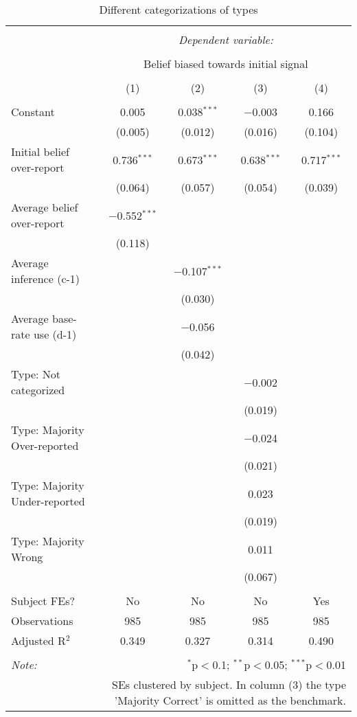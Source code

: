 
\begin{table}[!htbp] \centering 
  \caption{Different categorizations of types} 
  \label{tab:retractions_types} 
\begin{tabular}{@{\extracolsep{5pt}}lcccc} 
\\[-1.8ex]\hline 
\hline \\[-1.8ex] 
 & \multicolumn{4}{c}{\textit{Dependent variable:}} \\ 
\cline{2-5} 
\\[-1.8ex] & \multicolumn{4}{c}{Belief biased towards initial signal} \\ 
\\[-1.8ex] & (1) & (2) & (3) & (4)\\ 
\hline \\[-1.8ex] 
 Constant & 0.005 & 0.038$^{***}$ & $-$0.003 & 0.166 \\ 
  & (0.005) & (0.012) & (0.016) & (0.104) \\ 
  Initial belief over-report & 0.736$^{***}$ & 0.673$^{***}$ & 0.638$^{***}$ & 0.717$^{***}$ \\ 
  & (0.064) & (0.057) & (0.054) & (0.039) \\ 
  Average belief over-report & $-$0.552$^{***}$ &  &  &  \\ 
  & (0.118) &  &  &  \\ 
  Average inference (c-1) &  & $-$0.107$^{***}$ &  &  \\ 
  &  & (0.030) &  &  \\ 
  Average base-rate use (d-1) &  & $-$0.056 &  &  \\ 
  &  & (0.042) &  &  \\ 
  Type: Not categorized &  &  & $-$0.002 &  \\ 
  &  &  & (0.019) &  \\ 
  Type: Majority Over-reported &  &  & $-$0.024 &  \\ 
  &  &  & (0.021) &  \\ 
  Type: Majority Under-reported &  &  & 0.023 &  \\ 
  &  &  & (0.019) &  \\ 
  Type: Majority Wrong &  &  & 0.011 &  \\ 
  &  &  & (0.067) &  \\ 
 \hline \\[-1.8ex] 
Subject FEs? & No & No & No & Yes \\ 
Observations & 985 & 985 & 985 & 985 \\ 
Adjusted R$^{2}$ & 0.349 & 0.327 & 0.314 & 0.490 \\ 
\hline 
\hline \\[-1.8ex] 
\textit{Note:}  & \multicolumn{4}{r}{$^{*}$p$<$0.1; $^{**}$p$<$0.05; $^{***}$p$<$0.01} \\ 
 & \multicolumn{4}{r}{SEs clustered by subject. In column (3) the type 'Majority Correct' is omitted as the benchmark.} \\ 
\end{tabular} 
\end{table} 
